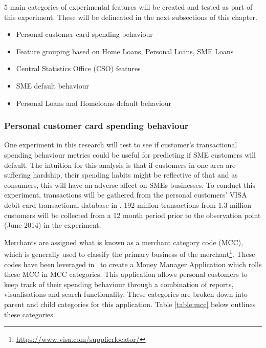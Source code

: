 5 main categories of experimental features will be created and tested as part of this experiment. These will be delineated in the next subsections of this chapter. 

\begin{itemize}
	\item Personal customer card spending behaviour
	\item Feature grouping based on Home Loans, Personal Loans, SME Loans
	\item Central Statistics Office (CSO) features
	\item SME default behaviour
	\item Personal Loans and Homeloans default behaviour
\end{itemize}


\subsubsection{Personal customer card spending behaviour}
One experiment in this research will test to see if customer's transactional spending behaviour metrics could be useful for predicting if SME customers will default. The intuition for this analysis is that if customers in one area are suffering hardship, their spending habits might be reflective of that and as consumers, this will have an adverse affect on SMEs businesses. To conduct this experiment, transactions will be gathered from the personal customers' VISA debit card transactional database in \subjectname. 192 million transactions from 1.3 million customers will be collected from a 12 month period prior to the observation point (June 2014) in the experiment. 

Merchants are assigned what is known as a merchant category code (MCC), which is generally used to classify the primary business of the merchant\footnote{\url{https://www.visa.com/supplierlocator/}}. These codes have been leveraged in \subjectname\ to create a Money Manager Application which rolls these MCC in MCC categories. This application allows personal customers to keep track of their spending behaviour through a combination of reports, visualisations and search functionality. These categories are broken down into parent and child categories for this application. Table \ref{table:mcc} below outlines these categories.

